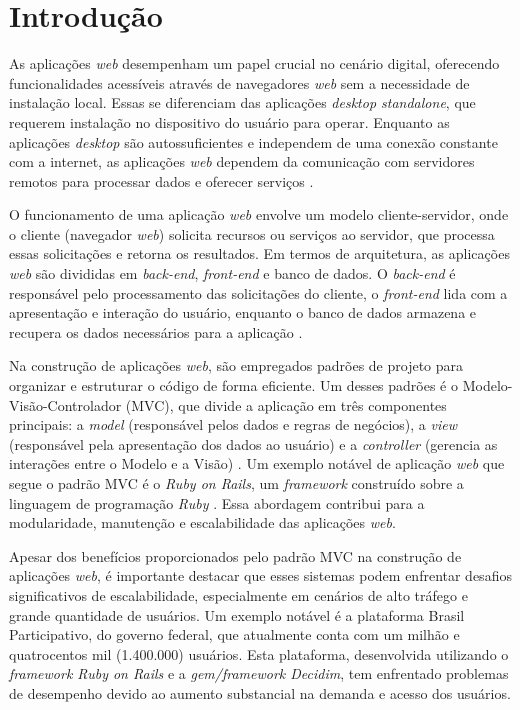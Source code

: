 \chapter{Introdução}

As aplicações \textit{web} desempenham um papel crucial no cenário digital, oferecendo funcionalidades acessíveis através de navegadores \textit{web} sem a necessidade de instalação local. Essas se diferenciam das aplicações \textit{desktop standalone}, que requerem instalação no dispositivo do usuário para operar. Enquanto as aplicações \textit{desktop} são autossuficientes e independem de uma conexão constante com a internet, as aplicações \textit{web} dependem da comunicação com servidores remotos para processar dados e oferecer serviços \cite{tanenbaum1978guidelines}.

O funcionamento de uma aplicação \textit{web} envolve um modelo cliente-servidor, onde o cliente (navegador \textit{web}) solicita recursos ou serviços ao servidor, que processa essas solicitações e retorna os resultados. Em termos de arquitetura, as aplicações \textit{web} são divididas em \textit{back-end}, \textit{front-end} e banco de dados. O \textit{back-end} é responsável pelo processamento das solicitações do cliente, o \textit{front-end} lida com a apresentação e interação do usuário, enquanto o banco de dados armazena e recupera os dados necessários para a aplicação \cite{gough2021mastering}.

Na construção de aplicações \textit{web}, são empregados padrões de projeto para organizar e estruturar o código de forma eficiente. Um desses padrões é o Modelo-Visão-Controlador (MVC), que divide a aplicação em três componentes principais: a \textit{model} (responsável pelos dados e regras de negócios), a \textit{view} (responsável pela apresentação dos dados ao usuário) e a \textit{controller} (gerencia as interações entre o Modelo e a Visão) \cite{Bucanek2009}. Um exemplo notável de aplicação \textit{web} que segue o padrão MVC é o \textit{Ruby on Rails}, um \textit{framework} construído sobre a linguagem de programação \textit{Ruby} \cite{railsapi2023}. Essa abordagem contribui para a modularidade, manutenção e escalabilidade das aplicações \textit{web}.

Apesar dos benefícios proporcionados pelo padrão MVC na construção de aplicações \textit{web}, é importante destacar que esses sistemas podem enfrentar desafios significativos de escalabilidade, especialmente em cenários de alto tráfego e grande quantidade de usuários. Um exemplo notável é a plataforma Brasil Participativo, do governo federal, que atualmente conta com um milhão e quatrocentos mil (1.400.000) usuários. Esta plataforma, desenvolvida utilizando o \textit{framework Ruby on Rails} e a \textit{gem/framework Decidim}, tem enfrentado problemas de desempenho devido ao aumento substancial na demanda e acesso dos usuários.

